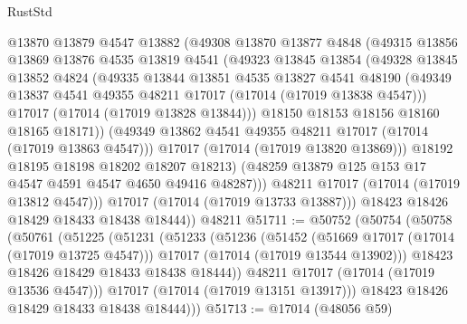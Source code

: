 \begin{lexlean}{RustStd}
\begin{coremodule}
                @13870
                @13879
                @4547
                @13882
                (@49308
                  @13870
                  @13877
                  @4848
                  (@49315
                    @13856
                    @13869
                    @13876
                    @4535
                    @13819
                    @4541
                    (@49323
                      @13845
                      @13854
                      (@49328
                        @13845
                        @13852
                        @4824
                        (@49335
                          @13844
                          @13851
                          @4535
                          @13827
                          @4541
                          @48190
                          (@49349 @13837 @4541 @49355 @48211 @17017 (@17014 (@17019 @13838 @4547)))
                          @17017
                          (@17014 (@17019 @13828 @13844)))
                        @18150
                        @18153
                        @18156
                        @18160
                        @18165
                        @18171))
                    (@49349 @13862 @4541 @49355 @48211 @17017 (@17014 (@17019 @13863 @4547)))
                    @17017
                    (@17014 (@17019 @13820 @13869)))
                  @18192
                  @18195
                  @18198
                  @18202
                  @18207
                  @18213)
                (@48259 @13879 @125 @153 @17 @4547 @4591 @4547 @4650 @49416 @48287)))
            @48211
            @17017
            (@17014 (@17019 @13812 @4547)))
          @17017
          (@17014 (@17019 @13733 @13887)))
        @18423
        @18426
        @18429
        @18433
        @18438
        @18444))
    @48211
@51711 := @50752
    (@50754
      (@50758
        (@50761
          (@51225
            (@51231
              (@51233
                (@51236
                  (@51452
                    (@51669 @17017 (@17014 (@17019 @13725 @4547)))
                    @17017
                    (@17014 (@17019 @13544 @13902)))
                  @18423
                  @18426
                  @18429
                  @18433
                  @18438
                  @18444))
              @48211
              @17017
              (@17014 (@17019 @13536 @4547)))
            @17017
            (@17014 (@17019 @13151 @13917)))
          @18423
          @18426
          @18429
          @18433
          @18438
          @18444)))
@51713 := @17014 (@48056 @59)

\end{coremodule}
\end{lexlean}
